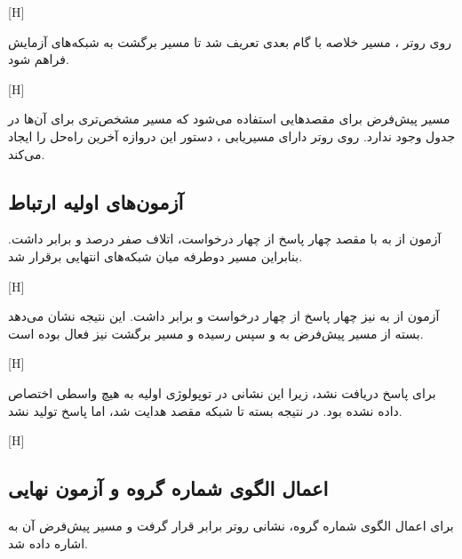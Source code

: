 [H]

روی روتر ، مسیر خلاصه  با گام بعدی
 تعریف شد تا مسیر برگشت به شبکه‌های آزمایش فراهم شود.

[H]

مسیر پیش‌فرض برای مقصدهایی استفاده می‌شود که مسیر مشخص‌تری برای آن‌ها در جدول
وجود ندارد. روی روتر دارای مسیریابی ، دستور
 این دروازه آخرین راه‌حل را ایجاد می‌کند.

\subsection{آزمون‌های اولیه ارتباط}

آزمون  از  به  با مقصد 
چهار پاسخ از چهار درخواست، اتلاف صفر درصد و  برابر  داشت.
بنابراین مسیر دوطرفه میان شبکه‌های انتهایی برقرار شد.

[H]

آزمون  از  به  نیز چهار پاسخ از چهار درخواست
و  برابر  داشت. این نتیجه نشان می‌دهد بسته از مسیر پیش‌فرض 
به  و سپس  رسیده و مسیر برگشت نیز فعال بوده است.

[H]

برای  پاسخ دریافت نشد، زیرا این نشانی در توپولوژی اولیه به هیچ
واسطی اختصاص داده نشده بود. در نتیجه بسته تا شبکه مقصد هدایت شد، اما پاسخ
 تولید نشد.

[H]

\subsection{اعمال الگوی شماره گروه و آزمون نهایی}

برای اعمال الگوی شماره گروه، نشانی  روتر  برابر
 قرار گرفت و مسیر پیش‌فرض آن به 
اشاره داده شد.

